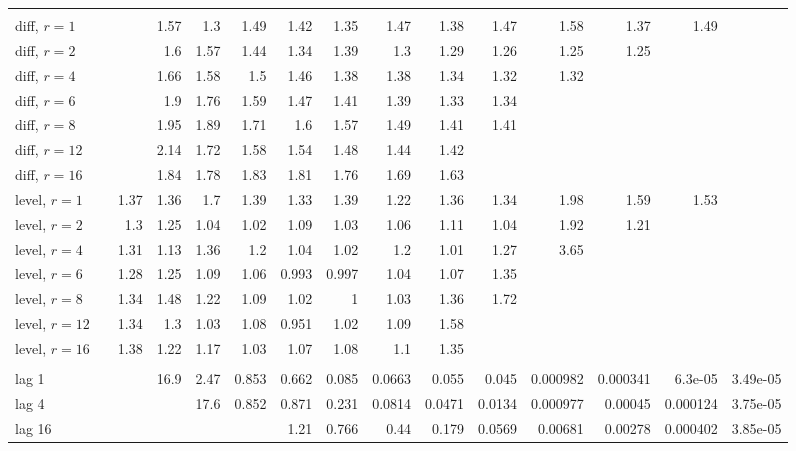 \begin{table}[t]
\begin{tabular}{lrrrrrrrrrrrrrr}
\addlinespace
\multicolumn{15}{l}{\textit{Moirai}} \\
\quad diff, $r{=}1$ &  &  & 1.57 & 1.3 & 1.49 & 1.42 & 1.35 & 1.47 & 1.38 & 1.47 & 1.58 & 1.37 & 1.49 &  \\
\quad diff, $r{=}2$ &  &  & 1.6 & 1.57 & 1.44 & 1.34 & 1.39 & 1.3 & 1.29 & 1.26 & 1.25 & 1.25 &  &  \\
\quad diff, $r{=}4$ &  &  & 1.66 & 1.58 & 1.5 & 1.46 & 1.38 & 1.38 & 1.34 & 1.32 & 1.32 &  &  &  \\
\quad diff, $r{=}6$ &  &  & 1.9 & 1.76 & 1.59 & 1.47 & 1.41 & 1.39 & 1.33 & 1.34 &  &  &  &  \\
\quad diff, $r{=}8$ &  &  & 1.95 & 1.89 & 1.71 & 1.6 & 1.57 & 1.49 & 1.41 & 1.41 &  &  &  &  \\
\quad diff, $r{=}12$ &  &  & 2.14 & 1.72 & 1.58 & 1.54 & 1.48 & 1.44 & 1.42 &  &  &  &  &  \\
\quad diff, $r{=}16$ &  &  & 1.84 & 1.78 & 1.83 & 1.81 & 1.76 & 1.69 & 1.63 &  &  &  &  &  \\
\quad level, $r{=}1$ &  & 1.37 & 1.36 & 1.7 & 1.39 & 1.33 & 1.39 & 1.22 & 1.36 & 1.34 & 1.98 & 1.59 & 1.53 &  \\
\quad level, $r{=}2$ &  & 1.3 & 1.25 & 1.04 & 1.02 & 1.09 & 1.03 & 1.06 & 1.11 & 1.04 & 1.92 & 1.21 &  &  \\
\quad level, $r{=}4$ &  & 1.31 & 1.13 & 1.36 & 1.2 & 1.04 & 1.02 & 1.2 & 1.01 & 1.27 & 3.65 &  &  &  \\
\quad level, $r{=}6$ &  & 1.28 & 1.25 & 1.09 & 1.06 & 0.993 & 0.997 & 1.04 & 1.07 & 1.35 &  &  &  &  \\
\quad level, $r{=}8$ &  & 1.34 & 1.48 & 1.22 & 1.09 & 1.02 & 1 & 1.03 & 1.36 & 1.72 &  &  &  &  \\
\quad level, $r{=}12$ &  & 1.34 & 1.3 & 1.03 & 1.08 & 0.951 & 1.02 & 1.09 & 1.58 &  &  &  &  &  \\
\quad level, $r{=}16$ &  & 1.38 & 1.22 & 1.17 & 1.03 & 1.07 & 1.08 & 1.1 & 1.35 &  &  &  &  &  \\
\addlinespace
\multicolumn{15}{l}{\textit{MLP}} \\
\quad lag 1 &  &  & 16.9 & 2.47 & 0.853 & 0.662 & 0.085 & 0.0663 & 0.055 & 0.045 & 0.000982 & 0.000341 & 6.3e-05 & 3.49e-05 \\
\quad lag 4 &  &  &  & 17.6 & 0.852 & 0.871 & 0.231 & 0.0814 & 0.0471 & 0.0134 & 0.000977 & 0.00045 & 0.000124 & 3.75e-05 \\
\quad lag 16 &  &  &  &  &  & 1.21 & 0.766 & 0.44 & 0.179 & 0.0569 & 0.00681 & 0.00278 & 0.000402 & 3.85e-05 \\

\end{tabular}
\end{table}
